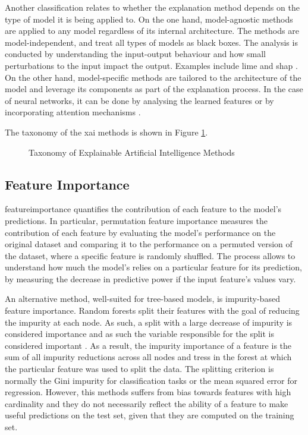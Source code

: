 Another classification relates to whether the explanation method depends on the type of model it is being applied to. On the one hand, model-agnostic methods are applied to any model regardless of its internal architecture. The methods are model-independent, and treat all types of models as black boxes. The analysis is conducted by understanding the input-output behaviour and how small perturbations to the input impact the output. Examples include \acrfull{lime} \cite{Ribeiro2016} and \acrfull{shap} \cite{Lundberg2017}. On the other hand, model-specific methods are tailored to the architecture of the model and leverage its components as part of the explanation process. In the case of neural networks, it can be done by analysing the learned features or by incorporating attention mechanisms \cite{Amirshahi2023}.

The taxonomy of the \acrshort{xai} methods is shown in Figure \ref{fig:xai_taxonomy}.
\begin{figure}[h]
    \centering
    
    \caption{Taxonomy of Explainable Artificial Intelligence Methods}
    \label{fig:xai_taxonomy}
\end{figure}

\subsection{Feature Importance} \label{sec:featureimportance}

\Gls{featureimportance} quantifies the contribution of each feature to the model's predictions. In particular, permutation feature importance \cite{Breiman2001} measures the contribution of each feature by evaluating the model's performance on the original dataset and comparing it to the performance on a permuted version of the dataset, where a specific feature is randomly shuffled. The process allows to understand how much the model's relies on a particular feature for its prediction, by measuring the decrease in predictive power if the input feature's values vary.

An alternative method, well-suited for tree-based models, is impurity-based feature importance. Random forests split their features with the goal of reducing the impurity at each node. As such, a split with a large decrease of impurity is considered importance and as such the variable responsible for the split is considered important \cite{Nembrini2018}. As a result, the impurity importance of a feature is the sum of all impurity reductions across all nodes and tress in the forest at which the particular feature was used to split the data. The splitting criterion is normally the Gini impurity for classification tasks or the mean squared error for regression. However, this methods suffers from bias towards features with high cardinality and they do not necessarily reflect the ability of a feature to make useful predictions on the test set, given that they are computed on the training set.

